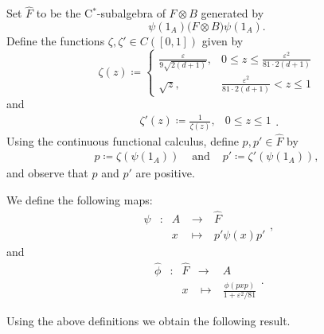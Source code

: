 \documentclass[a4paper]{amsart}
\newcommand{\myhyp}{\textnormal{-}\hskip0pt\relax}
\numberwithin{equation}{section}
\newcommand{\e}{\varepsilon}
\newcommand{\cont}[1]{C({#1})}
\newcommand{\cstarSub}{C$^\ast$\myhyp{}subalgebra}
\newcommand{\rAr}{\longrightarrow}
\theoremstyle{plain}
\theoremstyle{indented}
\numberwithin{equation}{section}
\theoremstyle{definition}
\theoremstyle{remark}
\theoremstyle{plain}
\theoremstyle{definition}
\begin{document}
    Set ${\widehat{F}}$ to be the \cstarSub{} of ${F \otimes B}$ generated by 
    \[\psi(1_A) \big( F \otimes B \big) \psi(1_A) .\]
    Define the functions ${\zeta, \zeta' \in \cont{[0,1]}}$ given by 
    \[
        \zeta(z) \coloneq \begin{cases}
            \frac{\e}{9 \sqrt{2 (d+1)}} , & 0 \le z \le \frac{\e^2}{81 \cdot 2 (d+1)}\\
            \sqrt{z}, & \frac{\e^2}{81 \cdot 2 (d+1)} < z \le 1
        \end{cases} \]
      and
      \[\begin{array}{cc}
           \zeta'(z) \coloneq \frac{1}{\zeta(z)}, &  0 \le z  \le 1 
      \end{array}.\]
    Using the continuous functional calculus, define ${p, p' \in \widehat{F}}$ by 
    \[\begin{array}{ccc}
        p \coloneq \zeta(\psi(1_A)) 
        & \text{ and }  &
     p' \coloneq \zeta'(\psi(1_A)),
    \end{array}\]
     and
     observe that $p$ and $p'$ are positive.
   
     We define the following maps:
    \[\begin{array}{ccccc}
        \widehat{\psi}& \colon & A
        &~\rAr~& \widehat{F}\\
       & & x &~\longmapsto~& p' \psi(x) p' \end{array},\]
       and
       \[\begin{array}{ccccc}
        \widehat{\phi}& \colon & \widehat{F} 
        &\longrightarrow & A \\
        & & x &~\longmapsto~& \frac{\phi( p  x  p )}{1+\e^2/81}   
    \end{array}.\]
    
    Using the above definitions we obtain the following result.
\end{document}
